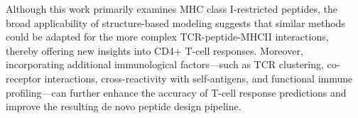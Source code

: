 Although this work primarily examines {MHC class I}-restricted peptides, the broad applicability of
structure-based modeling suggests that similar methods could be adapted for the more complex
TCR-peptide-MHCII interactions, thereby offering new insights into CD4+ T-cell responses. Moreover,
incorporating additional immunological factors---such as TCR clustering, co-receptor interactions,
cross-reactivity with self-antigens, and functional immune profiling---can further enhance the
accuracy of T-cell response predictions and improve the resulting {de novo} peptide design pipeline.

